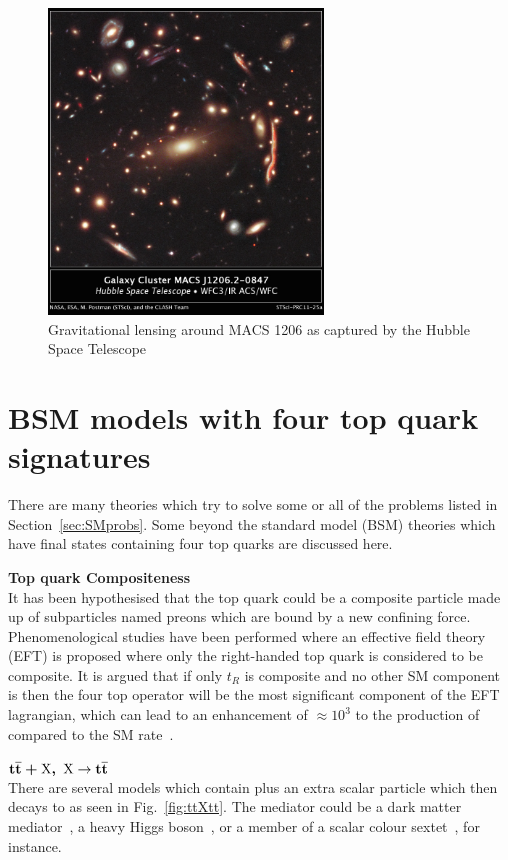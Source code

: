 \begin{figure}[ht!]
\centering
    \includegraphics[width=0.65\textwidth]{images/Theory/lensing2.jpg}
    \caption{Gravitational lensing around MACS 1206 as captured by the Hubble Space Telescope~\cite{Glens}}
    \label{fig:Glens}
\end{figure}



\section{BSM models with four top quark signatures ~\label{sec:BSMmodels}}

There are many theories which try to solve some or all of the problems listed in Section~\ref{sec:SMprobs}. Some beyond the standard model (BSM) theories which have final states containing four top quarks are discussed here. 

\textbf{Top quark Compositeness}\\
It has been hypothesised that the top quark could be a composite particle made up of subparticles named preons which are bound by a new confining force. Phenomenological studies have been performed where an effective field theory (EFT) is proposed where only the right-handed top quark is considered to be composite. It is argued that if only $t_{R}$ is composite and no other SM component is then the four top operator will be the most significant component of the EFT lagrangian, which can lead to an enhancement of $\approx 10^3$ to the production of \tttt compared to the SM rate~\cite{Tait2topcomp,Tait1topcomp}.

$\boldsymbol{\mathrm{t}\overline{\mathrm{t}}+\textrm{X}, ~\textrm{X}}\rightarrow\boldsymbol{\mathrm{t}\overline{\mathrm{t}}}$\\
There are several models which contain \ttbar plus an extra scalar particle which then decays to \ttbar as seen in Fig.~\ref{fig:ttXtt}.
The mediator could be a dark matter mediator~\cite{Arina2016}, a heavy Higgs boson~\cite{Bernreuther:2015fts}, or a member of a scalar colour sextet~\cite{Cacciapaglia2015}, for instance. 

